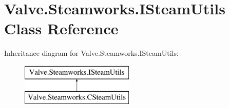 \hypertarget{classValve_1_1Steamworks_1_1ISteamUtils}{}\section{Valve.\+Steamworks.\+I\+Steam\+Utils Class Reference}
\label{classValve_1_1Steamworks_1_1ISteamUtils}
Inheritance diagram for Valve.\+Steamworks.\+I\+Steam\+Utils\+:\begin{figure}[H]
\begin{center}
\leavevmode
\includegraphics[height=2.000000cm]{classValve_1_1Steamworks_1_1ISteamUtils}
\end{center}
\end{figure}
